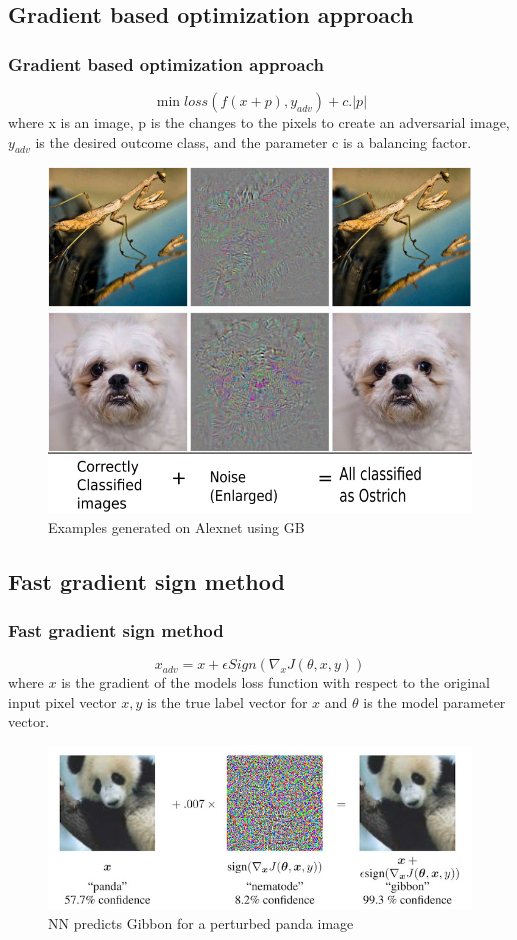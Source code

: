 \documentclass[12pt]{beamer}
\begin{document}
\subsection{Gradient based optimization approach}
\begin{frame}
\frametitle{Gradient based optimization approach}
$$\min loss(f(x + p), y_{adv}) + c.|p|$$
{\small where x is an image, p is the changes to the pixels to create an adversarial image, $y_{adv}$ is the desired outcome class, and the parameter c is a balancing factor.}

\begin{figure}
	\centering
	\includegraphics[width=0.5\linewidth, height=0.44\textheight]{img/adv_ex}
	\caption[Examples generated on Alexnet]{Examples generated on Alexnet using GB\protect\footnotemark}
	\label{fig:advex}
\end{figure}

\end{frame}

\subsection{Fast gradient sign method}
\begin{frame}
\frametitle{Fast gradient sign method}
$$x_{adv} = x + \epsilon Sign(\nabla_xJ(\theta,x,y))$$
where $x$ is the gradient of the models loss function with respect to the original input pixel vector $x, y$ is the true label vector for $x$ and $\theta$ is the model parameter vector.
\begin{figure}
	\centering
	\includegraphics[width=0.93\linewidth, height=0.43\textheight]{img/adversarial-panda}
	\caption{NN predicts Gibbon for a perturbed panda image\protect\footnotemark}
	\label{fig:adversarial-panda}
\end{figure}
\end{frame}
\end{document}
